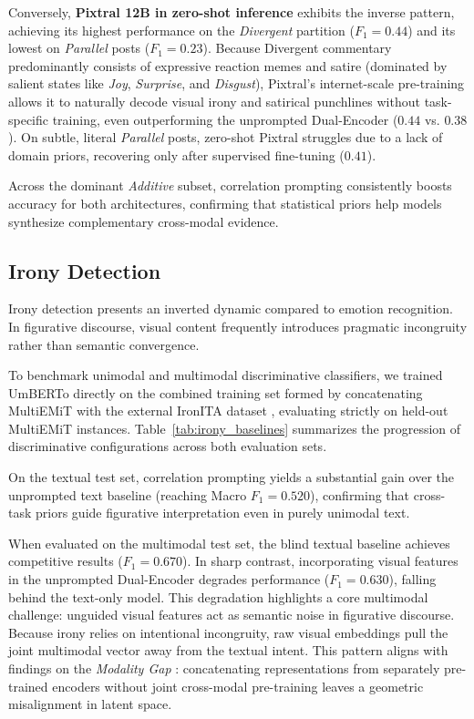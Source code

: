 Conversely, \textbf{Pixtral 12B in zero-shot inference} exhibits the inverse pattern, achieving its highest performance on the \textit{Divergent} partition ($F_1 = 0.44$) and its lowest on \textit{Parallel} posts ($F_1 = 0.23$). Because Divergent commentary predominantly consists of expressive reaction memes and satire (dominated by salient states like \textit{Joy}, \textit{Surprise}, and \textit{Disgust}), Pixtral's internet-scale pre-training allows it to naturally decode visual irony and satirical punchlines without task-specific training, even outperforming the unprompted Dual-Encoder ($0.44$ vs. $0.38$). On subtle, literal \textit{Parallel} posts, zero-shot Pixtral struggles due to a lack of domain priors, recovering only after supervised fine-tuning ($0.41$).

Across the dominant \textit{Additive} subset, correlation prompting consistently boosts accuracy for both architectures, confirming that statistical priors help models synthesize complementary cross-modal evidence.

\subsection{Irony Detection}
\label{sec:irony_results}

Irony detection presents an inverted dynamic compared to emotion recognition. In figurative discourse, visual content frequently introduces pragmatic incongruity rather than semantic convergence. 

To benchmark unimodal and multimodal discriminative classifiers, we trained UmBERTo directly on the combined training set formed by concatenating MultiEMiT with the external IronITA dataset \cite{ironita2018}, evaluating strictly on held-out MultiEMiT instances. Table~\ref{tab:irony_baselines} summarizes the progression of discriminative configurations across both evaluation sets.

On the textual test set, correlation prompting yields a substantial gain over the unprompted text baseline (reaching Macro $F_1 = 0.520$), confirming that cross-task priors guide figurative interpretation even in purely unimodal text.

When evaluated on the multimodal test set, the blind textual baseline achieves competitive results ($F_1 = 0.670$). In sharp contrast, incorporating visual features in the unprompted Dual-Encoder degrades performance ($F_1 = 0.630$), falling behind the text-only model. This degradation highlights a core multimodal challenge: unguided visual features act as semantic noise in figurative discourse. Because irony relies on intentional incongruity, raw visual embeddings pull the joint multimodal vector away from the textual intent. This pattern aligns with findings on the \textit{Modality Gap} \cite{liang2022mindgap}: concatenating representations from separately pre-trained encoders without joint cross-modal pre-training leaves a geometric misalignment in latent space.

